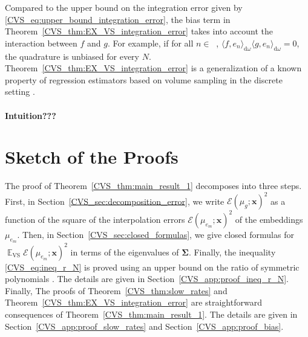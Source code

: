 \documentclass[twoside,11pt]{book}
\numberwithin{theorem}{chapter}
\numberwithin{definition}{chapter}
\numberwithin{proposition}{chapter}
\numberwithin{corollary}{chapter}
\numberwithin{example}{chapter}
\numberwithin{lemma}{chapter}
\numberwithin{assumption}{chapter}
\numberwithin{equation}{chapter}
\numberwithin{figure}{chapter}
\DeclareMathOperator{\VS}{\mathrm{VS}}
\DeclareMathOperator{\EX}{\mathbb{E}}
\DeclareMathOperator{\F}{\mathcal{F}}
\DeclareMathOperator{\Ns}{\mathbb{N}^{*}}
\newcommand{\pc}[1]{\textcolor{blue}{#1}}
\newcommand{\rb}[1]{\textcolor{magenta}{#1}}
\begin{document}
Compared to the upper bound on the integration error given by \eqref{CVS_eq:upper_bound_integration_error}, the bias term in Theorem~\ref{CVS_thm:EX_VS_integration_error} takes into account the interaction between $f$ and $g$. For example, if for all $n \in \Ns$, $\langle f,e_{n} \rangle_{\mathrm{d}\omega} \langle g,e_{n} \rangle_{\mathrm{d}\omega} = 0$, the quadrature is unbiased for every $N$.
Theorem~\ref{CVS_thm:EX_VS_integration_error} is a generalization of a known property of regression estimators based on volume sampling in the discrete setting \parencite{BeTe90,DeWa17,DeWaHs18,DeWaHs19}.

\paragraph{Intuition???}


\section{Sketch of the Proofs}\label{CVS_sec:steps_proof}
 The proof of Theorem~\ref{CVS_thm:main_result_1} decomposes into three steps. First, in Section~\ref{CVS_sec:decomposition_error}, we write $\mathcal{E}(\mu_{g};\bm{x})^{2}$ as a function of the square of the interpolation errors $\mathcal{E}(\mu_{e_{m}};\bm{x})^{2}$ of the embeddings
$\mu_{e_{m}}$. Then, in Section~\ref{CVS_sec:closed_formulas}, we give closed formulas for $\EX_{\VS} \mathcal{E}(\mu_{e_{m}};\bm{x})^{2}$ in terms of the eigenvalues of $\bm{\Sigma}$. Finally, the inequality \eqref{CVS_eq:ineq_r_N} is proved using an upper bound on the ratio of symmetric polynomials \parencite{GuSi12}. The details are given in Section~\ref{CVS_app:proof_ineq_r_N}. Finally, The proofs of Theorem~\ref{CVS_thm:slow_rates} and Theorem~\ref{CVS_thm:EX_VS_integration_error} are straightforward consequences of Theorem~\ref{CVS_thm:main_result_1}. The details are given in Section~\ref{CVS_app:proof_slow_rates} and Section~\ref{CVS_app:proof_bias}.
\end{document}
